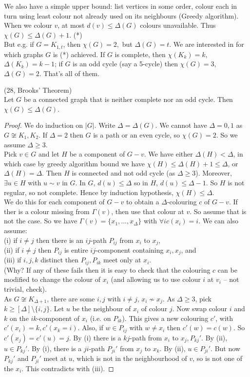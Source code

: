 \documentclass[a4paper]{article}
\begin{document}
We also have a simple upper bound: list vertices in some order, colour each in turn using least colour not already used on its neighbours (Greedy algorithm). When we colour $v$, at most $d(v) \leq \Delta(G)$ colours unavailable. Thus $\chi(G) \leq \Delta(G) + 1$. (*)\\
But e.g. if $G = K_{1,t}$, then $\chi(G) = 2,$ but $\Delta(G) = t$. We are interested in for which graphs $G$ is (*) achieved. If $G$ is complete, then $\chi(K_k) = k$, $\Delta(K_k) = k-1$; if $G$ is an odd cycle (say a 5-cycle) then $\chi(G) = 3$, $\Delta(G) = 2$. That's all of them.

\begin{thm} (28, Brooks' Theorem)\\
Let $G$ be a connected graph that is neither complete nor an odd cycle. Then $\chi(G) \leq \Delta(G)$.
\begin{proof}
We do induction on $|G|$. Write $\Delta = \Delta(G)$. We cannot have $\Delta = 0,1$ as $G \not\cong K_1,K_2$. If $\Delta = 2$ then $G$ is a path or an even cycle, so $\chi(G) = 2$. So we assume $\Delta \geq 3$.\\
Pick $v \in G$ and let $H$ be a component of $G-v$. We have either $\Delta(H) < \Delta$, in which case by greedy algorithm bound we have $\chi(H) \leq \Delta(H) + 1 \leq \Delta$, or $\Delta(H) = \Delta$. Then $H$ is connected and not odd cycle (as $\Delta \geq 3$). Moreover, $\exists u \in H$ with $u \sim v$ in $G$. In $G$, $d(u) \leq \Delta$ so in $H$, $d(u) \leq \Delta-1$. So $H$ is not regular, so not complete. Hence by induction hypothesis, $\chi(H) \leq \Delta$.\\
We do this for each component of $G-v$ to obtain a $\Delta$-colouring $c$ of $G-v$. If ther is a colour missing from $\Gamma(v)$, then use that colour at $v$. So assume that is not the case. So we have $\Gamma(v) = \{x_1,...,x_\Delta\}$ with $\forall i c(x_i) = i$. We can also assume:\\
(i) if $i \neq j$ then there is an $ij$-path $P_{ij}$ from $x_i$ to $x_j$,\\
(ii) if $i \neq j$ then $P_{ij}$ is entire $ij$-component containing $x_i, x_j$, and \\
(iii) if $i,j,k$ distinct then $P_{ij}, P_{ik}$ meet only at $x_i$.\\
(Why? If any of these fails then it is easy to check that the colouring $c$ can be modified to change the colour of $x_i$ (and allowing us to use colour $i$ at $v_i$ -- not trivial, check).\\
As $G \not\cong K_{\Delta+1}$, there are some $i,j$ with $i \neq j$, $x_i \not\sim x_j$. As $\Delta \geq 3$, pick $k \geq[\Delta] \setminus \{i,j\}$.  Let $u$ be the neighbour of $x_i$ of colour $j$. Now swap colour $i$ and $k$ on the $ik$-component of $x_i$ (i.e. on $P_{ik}$). This gives a new colouring $c'$, with $c'(x_i) = k, c'(x_k = i)$. Also, if $w \in P_{ij}$ with $w \neq x_i$ then $c'(w) = c(w)$. So $c'(x_j) = c'(u) = j$. By (i) there is a $kj$-path from $x_i$ to $x_j, P_{kj}'$. By (ii), $u \in P_{kj}'$. By (i), there is a $ji$-path $P_{ji}'$ from $x_j$ to $x_k$. By (ii), $u \in P_{ji}'$. But now $P_{kj}'$ and $P_{ji}'$ meet at $u$, which is not in the neighbourhood of $v$, so is not one of the $x_i$. This contradicts with (iii).

\end{proof}
\end{thm}
\end{document}
